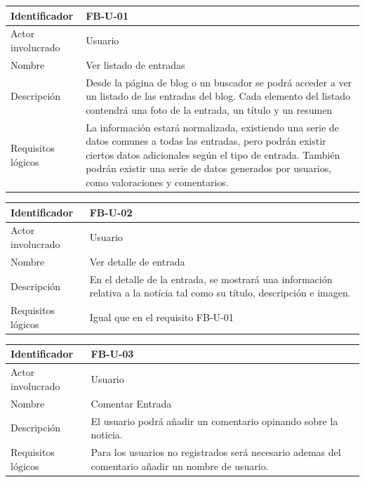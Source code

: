 \begin{table}[!htbp]
\centering
\begin{tabular}{|p{3cm}|p{10cm}|}
\hline
Identificador & FB-U-01 \\ \hline
Actor involucrado & Usuario \\ \hline
Nombre & Ver listado de entradas \\ \hline
Descripción & Desde la página de blog o un buscador se podrá acceder a ver un listado de las entradas del blog. Cada elemento del listado contendrá una foto de la entrada, un título y un resumen \\ \hline
Requisitos lógicos & La información estará normalizada, existiendo una serie de datos comunes a todas las entradas, pero podrán existir ciertos datos adicionales según el tipo de entrada. También podrán existir una serie de datos generados por usuarios, como valoraciones y comentarios. \\ \hline
\end{tabular}
\end{table}


\begin{table}[!htbp]
\centering
\begin{tabular}{|p{3cm}|p{10cm}|}
\hline
Identificador & FB-U-02 \\ \hline
Actor involucrado & Usuario \\ \hline
Nombre & Ver detalle de entrada \\ \hline
Descripción & En el detalle de la entrada, se mostrará una información relativa a la notícia tal como su título, descripción e imagen. \\ \hline
Requisitos lógicos & Igual que en el requisito FB-U-01 \\ \hline
\end{tabular}
\end{table}


\begin{table}[!htbp]
\centering
\begin{tabular}{|p{3cm}|p{10cm}|}
\hline
Identificador & FB-U-03 \\ \hline
Actor involucrado & Usuario \\ \hline
Nombre & Comentar Entrada\\ \hline
Descripción & El usuario podrá añadir un comentario opinando sobre la noticia.  \\ \hline
Requisitos lógicos & Para los usuarios no registrados será necesario ademas del comentario añadir un nombre de usuario. \\ \hline
\end{tabular}
\end{table}

